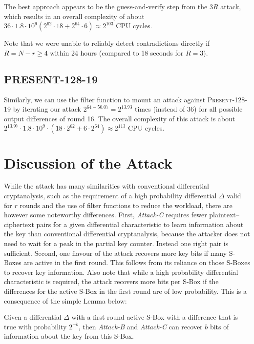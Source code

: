 \documentclass{llncs}
\newcommand{\PRESENT}{\textsc{Present}\xspace}
\begin{document}
The best approach appears to be the guess-and-verify step from the
$3R$ attack, which results in an overall complexity of about $36 \cdot 1.8 \cdot
10^9 (2^{62} \cdot 18 + 2^{64} \cdot 6) \approx 2^{103}$ CPU
cycles.

Note that we were unable to reliably detect contradictions directly if $R = N
- r \geq 4$ within 24 hours (compared to 18 seconds for $R=3$).

\subsection{PRESENT-128-19}
Similarly, we can use the filter function to mount an attack against
\PRESENT-128-19 by iterating our attack $2^{64-50.07} = 2^{13.93}$ times
(instead of 36) for all possible output differences of round 16. The overall
complexity of this attack is about $2^{13.97} \cdot 1.8
\cdot 10^9 \cdot (18 \cdot 2^{62} + 6 \cdot 2^{64}) \approx 2^{113}$ CPU
cycles.

\section{Discussion of the Attack}
\label{sec:discussion}
While the attack has many similarities with conventional differential
cryptanalysis, such as the requirement of a high probability differential
$\Delta$ valid for $r$ rounds and the use of filter functions to reduce the
workload, there are however some noteworthy differences. First,
\emph{Attack-C} requires fewer plaintext--ciphertext pairs for a given
differential characteristic to learn information about the key than
conventional differential cryptanalysis, because the attacker does not need to
wait for a peak in the partial key counter. Instead one right pair is
sufficient.
Second, one flavour of the attack recovers more key bits if many
S-Boxes are active in the first round. This follows from its reliance on those
S-Boxes to recover key information. Also note that while a high probability
differential characteristic is required, the attack recovers more bits per S-Box
if the differences for the active S-Box in the first round are of low
probability. This is a consequence of the simple Lemma below:
\begin{lemma}
\label{lem:sbox-prob}
Given a differential $\Delta$ with a first round active S-Box with a difference
that is true with probability $2^{-b}$, then \emph{Attack-B} and \emph{Attack-C} can recover $b$
bits of information about the key from this S-Box.
\end{lemma}
\end{document}
